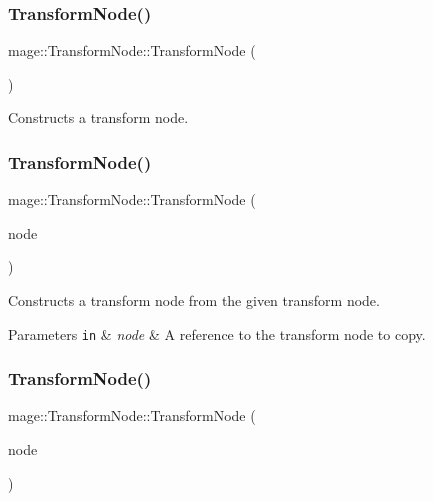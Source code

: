 \subsubsection{\texorpdfstring{Transform\+Node()}{TransformNode()}\hspace{0.1cm}{\footnotesize\ttfamily [1/3]}}
{\footnotesize\ttfamily mage\+::\+Transform\+Node\+::\+Transform\+Node (\begin{DoxyParamCaption}{ }\end{DoxyParamCaption})}

Constructs a transform node. \hypertarget{classmage_1_1_transform_node_a33ae343355c328a543b8665f7f1e9c3f}{}\label{classmage_1_1_transform_node_a33ae343355c328a543b8665f7f1e9c3f} 
\subsubsection{\texorpdfstring{Transform\+Node()}{TransformNode()}\hspace{0.1cm}{\footnotesize\ttfamily [2/3]}}
{\footnotesize\ttfamily mage\+::\+Transform\+Node\+::\+Transform\+Node (\begin{DoxyParamCaption}\item[{const \hyperlink{classmage_1_1_transform_node}{Transform\+Node} \&}]{node }\end{DoxyParamCaption})}

Constructs a transform node from the given transform node.


\begin{DoxyParams}[1]{Parameters}
\mbox{\tt in}  & {\em node} & A reference to the transform node to copy. \\
\hline
\end{DoxyParams}
\hypertarget{classmage_1_1_transform_node_aff227d1925614bc5afc03c981bc2a717}{}\label{classmage_1_1_transform_node_aff227d1925614bc5afc03c981bc2a717} 
\subsubsection{\texorpdfstring{Transform\+Node()}{TransformNode()}\hspace{0.1cm}{\footnotesize\ttfamily [3/3]}}
{\footnotesize\ttfamily mage\+::\+Transform\+Node\+::\+Transform\+Node (\begin{DoxyParamCaption}\item[{\hyperlink{classmage_1_1_transform_node}{Transform\+Node} \&\&}]{node }\end{DoxyParamCaption})\hspace{0.3cm}{\ttfamily [noexcept]}}

